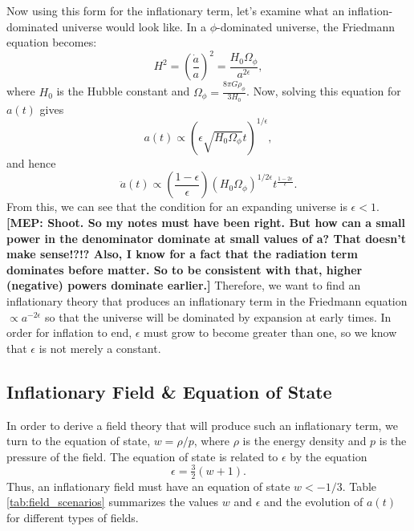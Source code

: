 \documentclass[onecolumn,apj]{emulateapj}
\newcommand{\mep}[1]{{\color{applegreen} \textbf{[MEP:  #1]}}}
\begin{document}
Now using this form for the inflationary term, let's examine what an inflation-dominated universe would look like. In a $\phi$-dominated universe, the Friedmann equation becomes:
\begin{equation}
H^2 = \left ( \frac{\dot a}{a} \right ) ^2 = \frac{H_0 \Omega_\phi}{a^{2\epsilon}},
\label{eqn:Friedmann_phi}
\end{equation}
where $H_0$ is the Hubble constant and $\Omega_\phi = \tfrac{8\pi G \rho_\phi}{3 H_0}$. Now, solving this equation for $a(t)$ gives
\begin{equation}
a(t) \propto (\epsilon \sqrt{H_0 \Omega_\phi} t)^{1/\epsilon},
\label{eqn:inflation_a(t)}
\end{equation}
and hence 
\begin{equation}
\ddot a(t) \propto \left ( \frac{1-\epsilon}{\epsilon} \right ) (H_0 \Omega_\phi)^{1/2\epsilon} t^{\tfrac{1-2\epsilon}{\epsilon}}. 
\end{equation}
From this, we can see that the condition for an expanding universe is $\epsilon<1$. \mep{Shoot. So my notes must have been right. But how can a small power in the denominator dominate at small values of a? That doesn't make sense!?!? Also, I know for a fact that the radiation term dominates before matter. So to be consistent with that, higher (negative) powers dominate earlier.} Therefore, we want to find an inflationary theory that produces an inflationary term in the Friedmann equation $\propto a^{-2\epsilon}$ so that the universe will be dominated by expansion at early times. In order for inflation to end, $\epsilon$ must grow to become greater than one, so we know that $\epsilon$ is not merely a constant. 

\subsection{Inflationary Field \& Equation of State}

In order to derive a field theory that will produce such an inflationary term, we turn to the equation of state, $w=\rho/p$, where $\rho$ is the energy density and $p$ is the pressure of the field. The equation of state is related to $\epsilon$ by the equation 
\begin{equation}
\epsilon = \tfrac{3}{2}(w+1). 
\label{eqn:eps_w}
\end{equation}
Thus, an inflationary field must have an equation of state $w<-1/3$. Table \ref{tab:field_scenarios} summarizes the values $w$ and $\epsilon$ and the evolution of $a(t)$ for different types of fields. 
\end{document}
